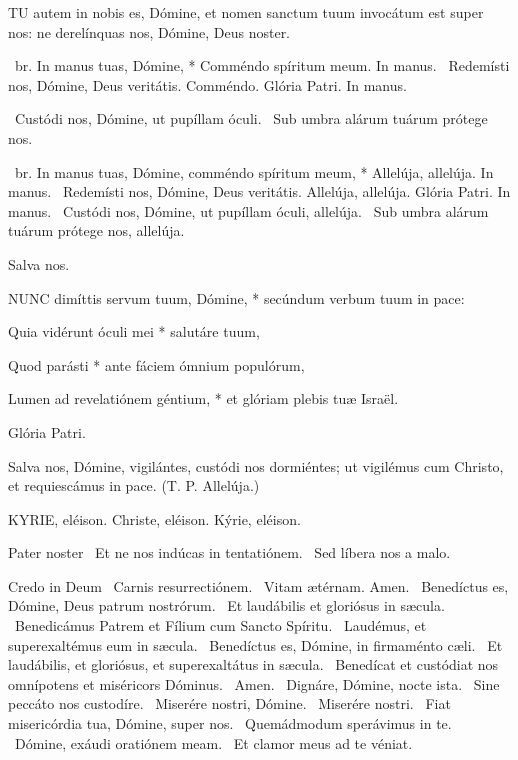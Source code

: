 
\lettrine[lines=2]{T}{U} autem in nobis es, Dómine, et nomen sanctum tuum invocátum est super nos: ne derelínquas nos, Dómine, Deus noster.

\R\ br. In manus tuas, Dómine, * Comméndo spíritum meum. In manus. \V\ Redemísti nos, Dómine, Deus veritátis. Comméndo. Glória Patri. In manus.

\V\ Custódi nos, Dómine, ut pupíllam óculi. \R\ Sub umbra alárum tuárum prótege nos.



\R\ br. In manus tuas, Dómine, comméndo spíritum meum, * Allelúja, allelúja. In manus. \V\ Redemísti nos, Dómine, Deus veritátis. Allelúja, allelúja. Glória Patri. In manus. \V\ Custódi nos, Dómine, ut pupíllam óculi, allelúja. \R\ Sub umbra alárum tuárum prótege nos, allelúja.

 Salva nos.


\lettrine[lines=2]{N}{UNC} dimíttis servum tuum, Dómine, * secúndum verbum tuum in pace:

Quia vidérunt óculi mei * salutáre tuum,

Quod parásti * ante fáciem ómnium populórum,

Lumen ad revelatiónem géntium, * et glóriam plebis tuæ Israël.

Glória Patri.

 Salva nos, Dómine, vigilántes, custódi nos dormiéntes; ut vigilémus cum Christo, et requiescámus in pace. (T. P. Allelúja.)


KYRIE, eléison. Christe, eléison. Kýrie, eléison.

Pater noster  \V\ Et ne nos indúcas in tentatiónem. \R\ Sed líbera nos a malo.

Credo in Deum  \V\ Carnis resurrectiónem. \R\ Vitam ætérnam. Amen. \V\ Benedíctus es, Dómine, Deus patrum nostrórum. \R\ Et laudábilis et gloriósus in sæcula. \V\ Benedicámus Patrem et Fílium cum Sancto Spíritu. \R\ Laudémus, et superexaltémus eum in sæcula. \V\ Benedíctus es, Dómine, in firmaménto cæli. \R\ Et laudábilis, et gloriósus, et superexaltátus in sæcula. \V\ Benedícat et custódiat nos omnípotens et miséricors Dóminus. \R\ Amen. \V\ Dignáre, Dómine, nocte ista. \R\ Sine peccáto nos custodíre. \V\ Miserére nostri, Dómine. \R\ Miserére nostri. \V\ Fiat misericórdia tua, Dómine, super nos. \R\ Quemádmodum sperávimus in te. \V\ Dómine, exáudi oratiónem meam. \R\ Et clamor meus ad te véniat.

